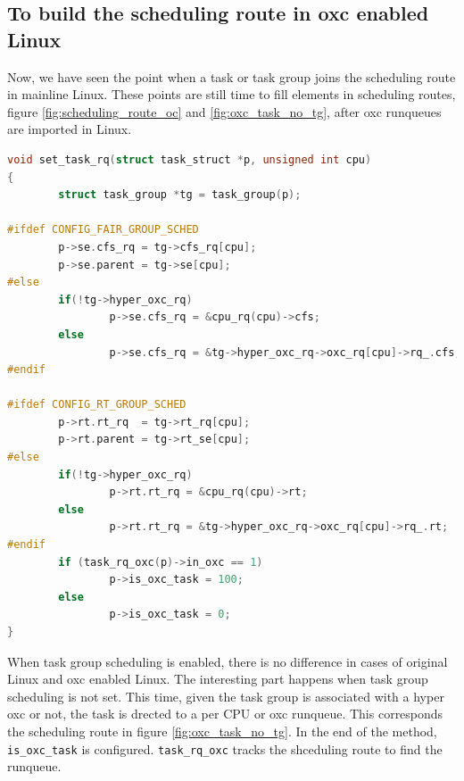 \subsection{To build the scheduling route in oxc enabled Linux}
Now, we have seen the point when a task or task group joins the scheduling 
route in mainline Linux. These points are still time to fill elements in 
scheduling routes, figure \ref{fig:scheduling_route_oc} and 
\ref{fig:oxc_task_no_tg}, after oxc runqueues are imported in Linux.
\begin{lstlisting}[language=C, 
        caption={To associate a task with a runqueue under oxc framework}]
void set_task_rq(struct task_struct *p, unsigned int cpu)
{
        struct task_group *tg = task_group(p);

#ifdef CONFIG_FAIR_GROUP_SCHED
        p->se.cfs_rq = tg->cfs_rq[cpu];
        p->se.parent = tg->se[cpu];
#else
        if(!tg->hyper_oxc_rq)
                p->se.cfs_rq = &cpu_rq(cpu)->cfs;
        else
                p->se.cfs_rq = &tg->hyper_oxc_rq->oxc_rq[cpu]->rq_.cfs;
#endif

#ifdef CONFIG_RT_GROUP_SCHED
        p->rt.rt_rq  = tg->rt_rq[cpu];
        p->rt.parent = tg->rt_se[cpu];
#else
        if(!tg->hyper_oxc_rq)
                p->rt.rt_rq = &cpu_rq(cpu)->rt;
        else
                p->rt.rt_rq = &tg->hyper_oxc_rq->oxc_rq[cpu]->rq_.rt;
#endif
        if (task_rq_oxc(p)->in_oxc == 1)
                p->is_oxc_task = 100;
        else
                p->is_oxc_task = 0;
}
\end{lstlisting}
                                                  
When task group scheduling is enabled, there is no difference in cases of 
original Linux and oxc enabled Linux. The interesting part happens when 
task group scheduling is not set. This time, given the task group is associated
with a hyper oxc or not, the task is drected to a per CPU or oxc runqueue. This 
corresponds the scheduling route in figure \ref{fig:oxc_task_no_tg}. In 
the end of the method, \texttt{is\_oxc\_task} is configured. 
\texttt{task\_rq\_oxc} tracks the shceduling route to find the runqueue.

